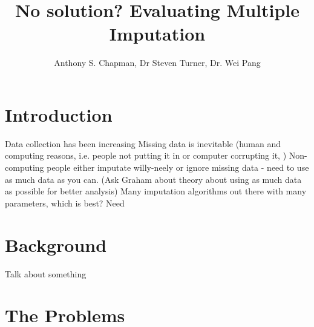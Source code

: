 \documentclass{IEEEconf}
\title{No solution? Evaluating Multiple Imputation}
\author{Anthony S. Chapman, Dr Steven Turner, Dr. Wei Pang}
\begin{document}
 
	\maketitle{} 



	\section{Introduction} %
	\label{sec:introduction}
		Data collection has been increasing 
		Missing data is inevitable (human and computing reasons, i.e. people not putting it in or computer corrupting it, )
		Non-computing people either imputate willy-neely or ignore missing data - need to use as much data as you can. (Ask Graham about theory about using as much data as possible for better analysis)
		Many imputation algorithms out there with many parameters, which is best? 
		Need 

	\section{Background} %
	\label{sec:background}
		Talk about something \cite{epi1}
		\cite{bigData}

	\section{The Problems} %
	\label{sec:the_problem}
\end{document}
